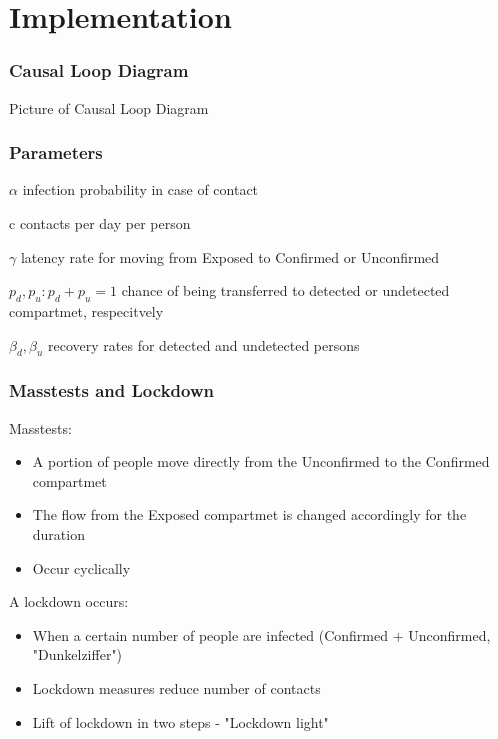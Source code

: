 \documentclass{beamer}
\begin{document}

\section{Implementation}

\begin{frame}
\frametitle{Causal Loop Diagram}
  Picture of Causal Loop Diagram
\end{frame}


\begin{frame}
\frametitle{Parameters}
\begin{block}{$\alpha$}
  infection probability in case of contact
\end{block}

\begin{block}{c}
  contacts per day per person
\end{block}

\begin{block}{$\gamma$}
  latency rate for moving from Exposed to Confirmed or Unconfirmed
\end{block}

\begin{block}{$p_d, p_u: p_d + p_u = 1$}
  chance of being transferred to detected or undetected compartmet, respecitvely
\end{block}

\begin{block}{$\beta_d, \beta_u$}
  recovery rates for detected and undetected persons
\end{block}
\end{frame}

\begin{frame}
\frametitle{Masstests and Lockdown}
Masstests:

\begin{itemize}
  \item A portion of people move directly from the Unconfirmed to the Confirmed compartmet
  \item The flow from the Exposed compartmet is changed accordingly for the duration
  \item Occur cyclically
\end{itemize}

A lockdown occurs:
\begin{itemize}
  \item When a certain number of people are infected (Confirmed + Unconfirmed, "Dunkelziffer")
  \item Lockdown measures reduce number of contacts
  \item Lift of lockdown in two steps - "Lockdown light"
\end{itemize}
\end{frame}
\end{document}
